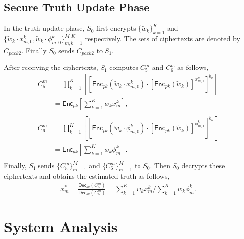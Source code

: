 \documentclass[conference]{IEEEtran}
\begin{document}
\subsection{Secure Truth Update Phase}
In the truth update phase, $S_0$ first encrypts $\{\tilde{w}_k\}_{k=1}^K$ and $\{\tilde{w}_k\cdot x_{m,0}^k, \tilde{w}_k\cdot \phi_{m,0}^k\}_{m,k=1}^{M,K}$ respectively.
The sets of ciphertexts are denoted by $C_{pack2}$.
Finally $S_0$ sends $C_{pack2}$ to $S_1$.

After receiving the ciphertexts, $S_1$ computes $C_5^m$ and $C_6^m$ as follows,
\begin{equation*}
  \begin{split}
    C_5^m & = \prod_{k=1}^K\left[\left[\mathsf{Enc}_{pk}\left(\tilde{w}_k\cdot x_{m,0}^k\right)\cdot \left[\mathsf{Enc}_{pk}\left(\tilde{w}_k\right)\right]^{x_{m,1}^k}\right]^{b_k} \right] \\
    & = \mathsf{Enc}_{pk}\left[\sum_{k=1}^K w_kx_m^k\right] , \\
  \end{split}
\end{equation*}
\begin{equation*}
  \begin{split}
    C_6^m & = \prod_{k=1}^K \left[ \left[ \mathsf{Enc}_{pk}(\tilde{w}_k\cdot \phi_{m,0}^k) \cdot \left[\mathsf{Enc}_{pk}(\tilde{w}_k)\right]^{\phi_{m,1}^k}\right]^{b_k} \right] \\
     & = \mathsf{Enc}_{pk}\left[\sum_{k=1}^K w_k\phi_m^k \right] . \\
  \end{split}
\end{equation*}
Finally, $S_1$ sends $\{C_5^m\}_{m=1}^M$ and $\{C_6^m\}_{m=1}^M$ to $S_0$.
Then $S_0$ decrypts these ciphertexts and obtains the estimated truth as follows,
\begin{equation}
  \begin{split}
    x_m^* = \frac{\mathsf{Dec}_{sk}(C_5^m)}{\mathsf{Dec}_{sk}(C_6^m)} = \sum\limits_{k=1}^K w_kx_m^k / \sum\limits_{k=1}^K w_k\phi_m^k .
  \end{split}
  \label{eq:xm}
\end{equation}

\section{System Analysis}\label{sec6}
\end{document}
